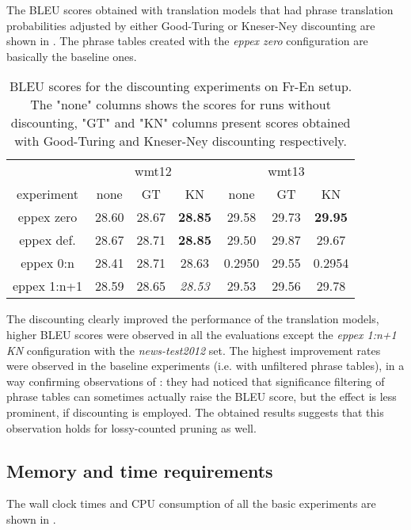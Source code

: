 The BLEU scores obtained with translation models that had phrase translation probabilities
adjusted by either Good-Turing or Kneser-Ney discounting are shown in .
The phrase tables created with the \emph{eppex zero} configuration are basically the
baseline ones.

\begin{table}[ht]
\centering
\begin{tabular}{ | c | c c c | c c c | }
\hline
 & \multicolumn{3}{|c|}{wmt12} & \multicolumn{3}{|c|}{wmt13} \\
experiment & none & GT & KN & none & GT & KN \\
\hline
\hline
eppex zero    & 28.60 & 28.67 & \textbf{28.85} & 29.58 & 29.73 & \textbf{29.95} \\
eppex def.    & 28.67 & 28.71 & \textbf{28.85} & 29.50 & 29.87 & 29.67 \\
eppex 0:n     & 28.41 & 28.71 & 28.63 & 0.2950 & 29.55 & 0.2954 \\
eppex 1:n+1   & 28.59 & 28.65 & \emph{28.53} & 29.53 & 29.56 & 29.78 \\
\hline
\end{tabular}
\caption{\label{fr-en-smoothed-bleu}
BLEU scores for the discounting experiments on Fr-En setup.
The "none" columns shows the scores for runs without discounting, "GT" and "KN" columns
present scores obtained with Good-Turing and Kneser-Ney discounting respectively.}
\end{table}

The discounting clearly improved the performance of the translation models,
higher BLEU scores were observed in all the evaluations except the \emph{eppex 1:n+1 KN}
configuration with the \emph{news-test2012} set.
The highest improvement rates were observed in the baseline experiments (i.e. with unfiltered
phrase tables), in a way confirming observations of \citet{johnson:sigfilter}:
they had noticed that significance filtering of phrase tables can sometimes actually raise
the BLEU score, but the effect is less prominent, if discounting is employed.
The obtained results suggests that this observation holds for lossy-counted pruning as well.

\subsection{Memory and time requirements}

The wall clock times and CPU consumption of all the basic experiments are shown
in .

